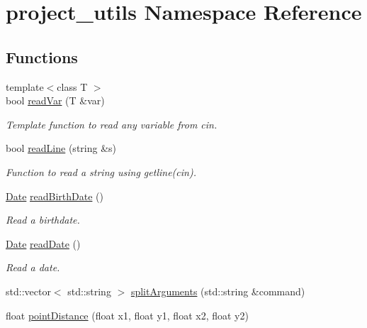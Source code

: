 \hypertarget{namespaceproject__utils}{}\section{project\+\_\+utils Namespace Reference}
\label{namespaceproject__utils}
\subsection*{Functions}
\begin{DoxyCompactItemize}
\item 
{\footnotesize template$<$class T $>$ }\\bool \mbox{\hyperlink{namespaceproject__utils_a72293f22700ff24cdf6663f45ca10c91}{read\+Var}} (T \&var)
\begin{DoxyCompactList}\small\item\em Template function to read any variable from cin. \end{DoxyCompactList}\item 
bool \mbox{\hyperlink{namespaceproject__utils_aab1cf7fd8bfa2074ed3e6fb99fa973dc}{read\+Line}} (string \&s)
\begin{DoxyCompactList}\small\item\em Function to read a string using getline(cin). \end{DoxyCompactList}\item 
\mbox{\hyperlink{classDate}{Date}} \mbox{\hyperlink{namespaceproject__utils_adab6593a2685f866191793214c7c60ce}{read\+Birth\+Date}} ()
\begin{DoxyCompactList}\small\item\em Read a birthdate. \end{DoxyCompactList}\item 
\mbox{\hyperlink{classDate}{Date}} \mbox{\hyperlink{namespaceproject__utils_a747fa96e998a1a6fb365d2512190098e}{read\+Date}} ()
\begin{DoxyCompactList}\small\item\em Read a date. \end{DoxyCompactList}\item 
std\+::vector$<$ std\+::string $>$ \mbox{\hyperlink{namespaceproject__utils_a8a3acf9a2b81c44b525870adb954dcff}{split\+Arguments}} (std\+::string \&command)
\item 
float \mbox{\hyperlink{namespaceproject__utils_ac8764d0b6de158f9eba38a6b517d8cd8}{point\+Distance}} (float x1, float y1, float x2, float y2)
\end{DoxyCompactItemize}


